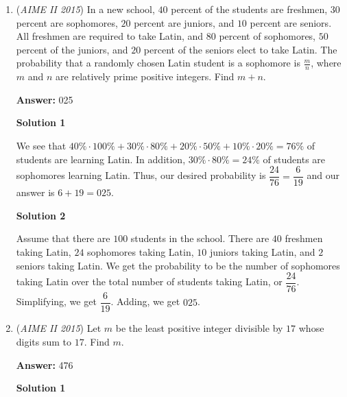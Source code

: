 \begin{enumerate}
 We know that any possible value of $N$ will be an integral multiple of this value; the smallest such $N$ is achieved by multiplying this value by $25.$ We arrive at $1131$, which is $\boxed{131}\mod1000.$



	\item (\textit{AIME II 2015}) In a new school, $40$ percent of the students are freshmen, $30$ percent are sophomores, $20$ percent are juniors, and $10$ percent are seniors. All freshmen are required to take Latin, and $80$ percent of sophomores, $50$ percent of the juniors, and $20$ percent of the seniors elect to take Latin. The probability that a randomly chosen Latin student is a sophomore is $\frac{m}{n}$, where $m$ and $n$ are relatively prime positive integers. Find $m+n$.


 
 \textbf{Answer: }025



\textbf{Solution 1}

We see that $40\% \cdot 100\% + 30\% \cdot 80\% + 20\% \cdot 50\% + 10\% \cdot 20\% = 76\%$ of students are learning Latin. In addition, $30\% \cdot 80\% = 24\%$ of students are sophomores learning Latin. Thus, our desired probability is $\dfrac{24}{76}=\dfrac{6}{19}$ and our answer is $6+19=\boxed{025}$.

 



\textbf{Solution 2}

Assume that there are $100$ students in the school. There are $40$ freshmen taking Latin, $24$ sophomores taking Latin, $10$ juniors taking Latin, and $2$ seniors taking Latin. We get the probability to be the number of sophomores taking Latin over the total number of students taking Latin, or $\dfrac{24}{76}$. Simplifying, we get $\dfrac{6}{19}$. Adding, we get $\boxed{025}$.

 


 


	\item (\textit{AIME II 2015}) Let $m$ be the least positive integer divisible by $17$ whose digits sum to $17$. Find $m$.


 
 \textbf{Answer: }476



\textbf{Solution 1}


\end{enumerate}
